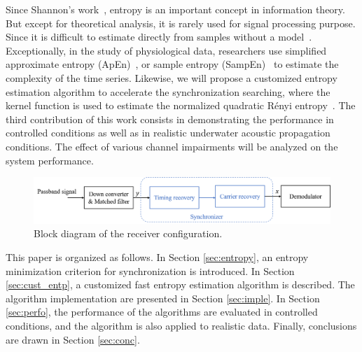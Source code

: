 \documentclass[journal,comsoc]{IEEEtran}
\begin{document}
Since Shannon's work~\cite{Shannon1948}, entropy is an important concept in information theory. 
But except for theoretical analysis, it is rarely used for signal processing purpose.
Since it is difficult to estimate directly from samples without a model~\cite{Bercher2000,Santamaria2002}.
Exceptionally, in the study of physiological data, researchers use simplified approximate entropy (ApEn)~\cite{Pincus1991}, or sample entropy (SampEn)~\cite{Richman2000} to estimate the complexity of the time series.
Likewise, we will propose a customized entropy estimation algorithm to accelerate the synchronization searching,
where the kernel function is used to estimate the normalized quadratic R\'enyi entropy~\cite{Santamaria2002,Huang2008}.
The third contribution of this work consists in demonstrating the performance in controlled conditions as well as in realistic underwater acoustic propagation conditions.  
The effect of various channel impairments will be analyzed on the system performance.  

\begin{figure}[ht]
\centering
\includegraphics[width=5.5 in]{pic/sys_conf.png}
\caption{Block diagram of the receiver configuration.}
\label{fig:sysconf} 
\end{figure}

This paper is organized as follows.
In Section \ref{sec:entropy},
an entropy minimization criterion for synchronization is introduced. 
In Section \ref{sec:cust_entp}, a customized fast entropy estimation algorithm is described. 
The algorithm implementation are presented in Section \ref{sec:imple}.
In Section \ref{sec:perfo}, the performance of the algorithms are evaluated in controlled conditions, and the algorithm is also applied to realistic data.  
Finally, conclusions are drawn in Section \ref{sec:conc}.
\end{document}
